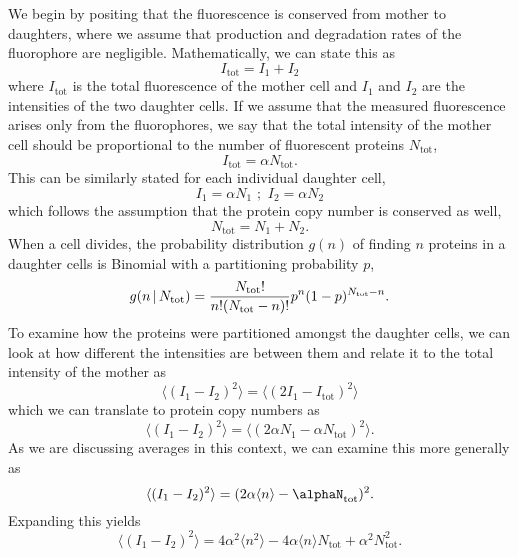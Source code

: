 We begin by positing that the fluorescence is conserved from mother to
daughters, where we assume that production and degradation rates of the
fluorophore are negligible. Mathematically, we can state this as
\begin{equation}
I_\text{tot} = I_1 + I_2
\label{eq:fluo_cons}
\end{equation}
where $I_\text{tot}$ is the total fluorescence of the mother cell and $I_1$ and
$I_2$ are the intensities of the two daughter cells. If we assume that the
measured fluorescence arises only from the fluorophores, we say that the
total intensity of the mother cell should be proportional to the number of
fluorescent proteins $N_\text{tot}$,
\begin{equation}
I_\text{tot} = \alpha N_\text{tot}.
\label{eq:antot}
\end{equation}
This can be similarly stated for each individual daughter cell,
\begin{equation}
I_1 = \alpha N_1\,\, ; \,\, I_2 = \alpha N_2
\end{equation}
which follows the assumption that the protein copy number is conserved as well,
\begin{equation}
N_\text{tot} = N_1 + N_2.
\end{equation}
When a cell divides, the probability distribution $g(n)$  of finding $n$ proteins
in a daughter cells is Binomial with a partitioning probability $p$,
\begin{equation}
g(n \, \vert \, N_\text{tot}) = {N_\text{tot}! \over n! (N_\text{tot} - n)!} p^{n}(1 - p)^{N_\text{tot} - n}.
\label{eq:binomial}
\end{equation}
To examine how the proteins were partitioned amongst the daughter cells, we can
look at how different the intensities are between them and relate it to the
total intensity of the mother as
\begin{equation}
\langle(I_1 - I_2)^2\rangle = \langle (2I_1 - I_\text{tot})^2 \rangle
\end{equation}
which we can translate to protein copy numbers as
\begin{equation}
\langle(I_1 - I_2)^2\rangle = \langle\left(2\alpha N_1 - \alpha N_\text{tot}\right)^2\rangle.
\end{equation}
As we are discussing averages in this context, we can examine this more generally as
\begin{equation}
\langle(I_1 - I_2)^2 \rangle = (2\alpha\langle n \rangle - \alphaN_\text{tot})^2.
\end{equation}
Expanding this yields
\begin{equation}
  \langle (I_1 - I_2)^2 \rangle = 4\alpha^2\langle n^2 \rangle - 4\alpha\langle n \rangle N_\text{tot} + \alpha^2 N_\text{tot}^2.
\end{equation}

